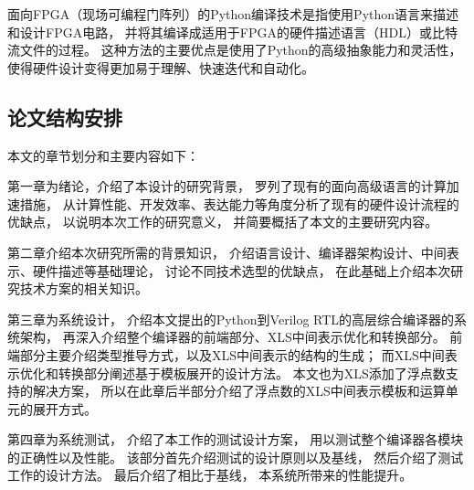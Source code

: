 面向FPGA（现场可编程门阵列）的Python编译技术是指使用Python语言来描述和设计FPGA电路，
并将其编译成适用于FPGA的硬件描述语言（HDL）或比特流文件的过程。
这种方法的主要优点是使用了Python的高级抽象能力和灵活性，
使得硬件设计变得更加易于理解、快速迭代和自动化。

\subsection{论文结构安排}

本文的章节划分和主要内容如下：

第一章为绪论，介绍了本设计的研究背景，
罗列了现有的面向高级语言的计算加速措施，
从计算性能、开发效率、表达能力等角度分析了现有的硬件设计流程的优缺点，
以说明本次工作的研究意义，
并简要概括了本文的主要研究内容。

第二章介绍本次研究所需的背景知识，
介绍语言设计、编译器架构设计、中间表示、硬件描述等基础理论，
讨论不同技术选型的优缺点，
在此基础上介绍本次研究技术方案的相关知识。

第三章为系统设计，
介绍本文提出的Python到Verilog RTL的高层综合编译器的系统架构，
再深入介绍整个编译器的前端部分、XLS中间表示优化和转换部分。
前端部分主要介绍类型推导方式，以及XLS中间表示的结构的生成；
而XLS中间表示优化和转换部分阐述基于模板展开的设计方法。
本文也为XLS添加了浮点数支持的解决方案，
所以在此章后半部分介绍了浮点数的XLS中间表示模板和运算单元的展开方式。

第四章为系统测试，
介绍了本工作的测试设计方案，
用以测试整个编译器各模块的正确性以及性能。
该部分首先介绍测试的设计原则以及基线，
然后介绍了测试工作的设计方法。
最后介绍了相比于基线，
本系统所带来的性能提升。